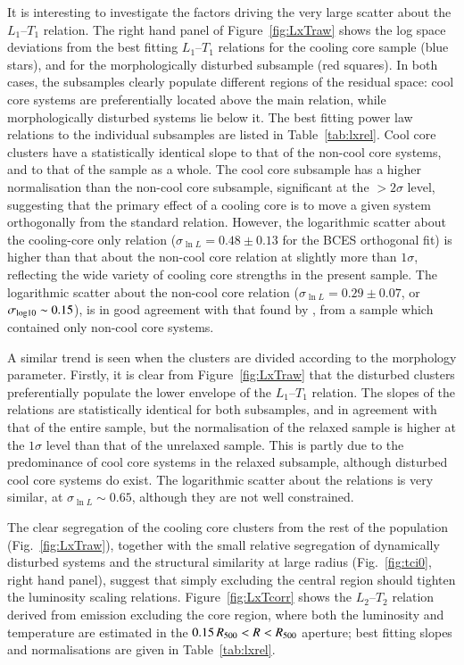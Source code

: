 \documentclass[oldversion]{aa}
\begin{document}
{It is interesting to investigate the factors driving the very large
scatter about the $L_1$--$T_1$ relation.
The right hand panel of Figure~\ref{fig:LxTraw} shows the log space
deviations from the best fitting $L_1$--$T_1$
relations for the cooling core sample (blue stars), and for the
morphologically disturbed subsample (red squares). In both cases, the subsamples
clearly populate different regions of the residual space: cool core
systems are preferentially located above the main relation, while
morphologically disturbed systems lie below it.
The best fitting power law relations to the individual subsamples
are listed in Table~\ref{tab:lxrel}. 
Cool core clusters have a statistically identical slope to that of the
non-cool core systems, and to that of the sample as a whole. 
The cool core subsample has a higher normalisation than the non-cool
core subsample, significant at the $> 2 \sigma$ level, suggesting that
the primary effect of a cooling core is to move a given system
orthogonally from the standard relation. However, the logarithmic scatter about the cooling-core only relation ($\sigma_{\ln{L}} = 0.48\pm0.13$ for the BCES orthogonal fit) is higher than that about the non-cool core relation at slightly more than $1\sigma$, reflecting the wide variety of cooling core strengths in the present sample. The logarithmic scatter about the non-cool core
relation ($\sigma_{\ln{L}} = 0.29\pm0.07$, or $\sigma_{\rm log10} \sim 0.15$), is in good agreement with that found by \citet{ae99}, from a sample which contained only non-cool core systems.

A similar trend is seen when the clusters are divided according to the
morphology parameter. Firstly, it is clear from
Figure~\ref{fig:LxTraw} that the 
disturbed clusters preferentially populate the lower envelope of the
$L_1$--$T_1$ relation. The slopes of the relations are statistically
identical for both subsamples, and in agreement with that of the
entire sample, but the normalisation of the relaxed sample is higher
at the $1 \sigma$ level than that of the unrelaxed sample. This is partly due to the predominance of cool core systems in
the relaxed subsample, although disturbed cool core systems do
exist. The logarithmic scatter about the relations is very similar, at $\sigma_{\ln{L}} \sim 0.65$, although they are not well constrained.

The clear segregation of the cooling core clusters from the rest of
the population (Fig.~\ref{fig:LxTraw}), together with the small
relative segregation of dynamically disturbed systems and the
structural similarity at large radius (Fig.~\ref{fig:tci0}, right hand
panel), suggest
that simply excluding the central region should tighten the luminosity
scaling relations. Figure~\ref{fig:LxTcorr} shows the $L_2$--$T_2$ relation
derived from emission excluding the core region, where both
the luminosity and temperature are estimated in the $0.15\,R_{500} < R <
R_{500}$ aperture; best fitting slopes and normalisations are given in
Table~\ref{tab:lxrel}. 

}
\end{document}
